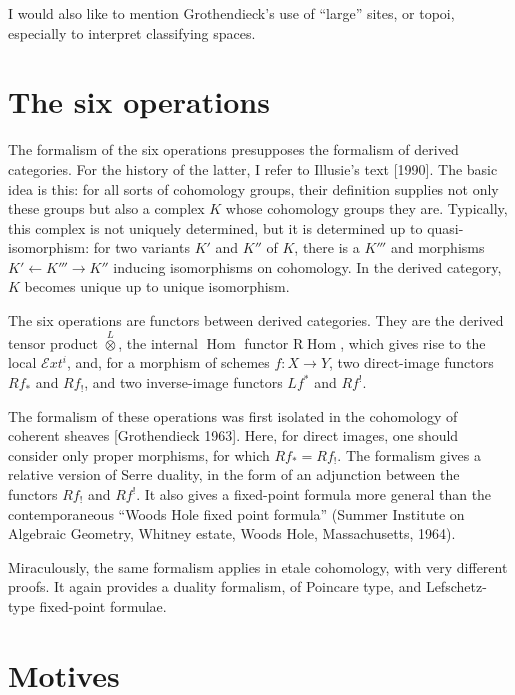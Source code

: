 \documentclass[11pt,a4paper]{article}
\theoremstyle{plain}
\theoremstyle{definition}
\DeclareMathOperator{\Hom}{Hom}
\begin{document}
I would also like to mention Grothendieck's use of ``large'' sites, or topoi, especially to interpret classifying spaces.

\section{The six operations}

The formalism of the six operations presupposes the formalism of derived categories. For the history of the latter, I refer to Illusie's text [1990]. The basic idea is this: for all sorts of cohomology groups, their definition supplies not only these groups but also a complex $K$ whose cohomology groups they are. Typically, this complex is not uniquely determined, but it is determined up to quasi-isomorphism: for two variants $K'$ and $K''$ of $K$, there is a $K'''$ and morphisms $K'\leftarrow K'''\rightarrow K''$ inducing isomorphisms on cohomology. In the derived category, $K$ becomes unique up to unique isomorphism.

The six operations are functors between derived categories. They are the derived tensor product $\overset{L}{\otimes}$, the internal $\Hom$ functor $\mathrm{R}\!\Hom$, which gives rise to the local $\mathcal{E}\!\mathit{xt}^i$, and, for a morphism of schemes $f:X\to Y$, two direct-image functors $Rf_*$ and $Rf_!$, and two inverse-image functors $Lf^*$ and $Rf^!$.

The formalism of these operations was first isolated in the cohomology of coherent sheaves [Grothendieck 1963]. Here, for direct images, one should consider only proper morphisms, for which $Rf_*=Rf_!$. The formalism gives a relative version of Serre duality, in the form of an adjunction between the functors $Rf_!$ and $Rf^!$. It also gives a fixed-point formula more general than the contemporaneous ``Woods Hole fixed point formula'' (Summer Institute on Algebraic Geometry, Whitney estate, Woods Hole, Massachusetts, 1964).

Miraculously, the same formalism applies in etale cohomology, with very different proofs. It again provides a duality formalism, of Poincare type, and Lefschetz-type fixed-point formulae.

\section{Motives}
\end{document}
